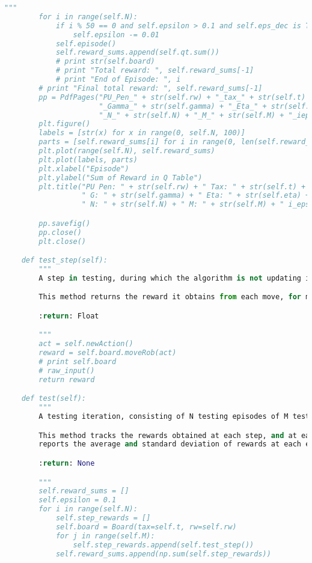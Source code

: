 \documentclass[12pt,a4paper]{article}
\begin{document}
\begin{lstlisting}[language=Python,numbers=none,basicstyle=\tiny]
        """
        for i in range(self.N):
            if i % 50 == 0 and self.epsilon > 0.1 and self.eps_dec is True:
                self.epsilon -= 0.01
            self.episode()
            self.reward_sums.append(self.qt.sum())
            # print str(self.board)
            # print "Total reward: ", self.reward_sums[-1]
            # print "End of Episode: ", i
        # print "Final total reward: ", self.reward_sums[-1]
        pp = PdfPages("PU_Pen_" + str(self.rw) + "_tax_" + str(self.t) + "_epsdec_" + str(self.eps_dec) +
                      "_Gamma_" + str(self.gamma) + "_Eta_" + str(self.eta) +
                      "_N_" + str(self.N) + "_M_" + str(self.M) + "_ieps_" + str(self.init_eps) + ".pdf")
        plt.figure()
        labels = [str(x) for x in range(0, self.N, 100)]
        parts = [self.reward_sums[i] for i in range(0, len(self.reward_sums), 100)]
        plt.plot(range(self.N), self.reward_sums)
        plt.plot(labels, parts)
        plt.xlabel("Episode")
        plt.ylabel("Sum of Reward in Q Table")
        plt.title("PU Pen: " + str(self.rw) + " Tax: " + str(self.t) + " Eps Dec: " + str(self.eps_dec) +
                  " G: " + str(self.gamma) + " Eta: " + str(self.eta) +
                  " N: " + str(self.N) + " M: " + str(self.M) + " i_eps: " + str(self.init_eps))

        pp.savefig()
        pp.close()
        plt.close()

    def test_step(self):
        """
        A step in testing, during which the algorithm is not updating its matrix.

        This method returns the reward it obtains from each move, for measurement purposes.

        :return: Float

        """
        act = self.newAction()
        reward = self.board.moveRob(act)
        # print self.board
        # raw_input()
        return reward

    def test(self):
        """
        A testing iteration, consisting of N testing episodes of M testing steps.

        This method tracks the rewards obtained at each step, and at each episode, and
        reports the average and standard deviation of rewards at each episode in a text file.

        :return: None

        """
        self.reward_sums = []
        self.epsilon = 0.1
        for i in range(self.N):
            self.step_rewards = []
            self.board = Board(tax=self.t, rw=self.rw)
            for j in range(self.M):
                self.step_rewards.append(self.test_step())
            self.reward_sums.append(np.sum(self.step_rewards))


\end{lstlisting}
\end{document}

